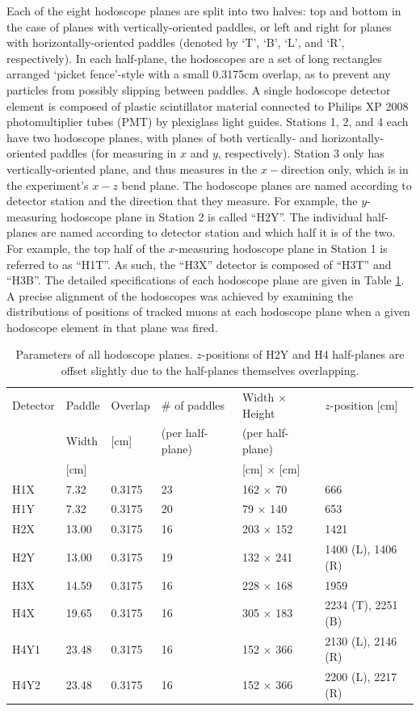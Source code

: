 Each of the eight hodoscope planes are split into two halves: top and bottom in the case of planes with vertically-oriented paddles, or left and right for planes with horizontally-oriented paddles (denoted by `T', `B', `L', and `R', respectively). In each half-plane, the hodoscopes are a set of long rectangles arranged `picket fence'-style with a small 0.3175cm overlap, as to prevent any particles from possibly slipping between paddles. A single hodoscope detector element is composed of plastic scintillator material connected to Philips XP 2008 photomultiplier tubes (PMT) by plexiglass light guides. Stations 1, 2, and 4 each have two hodoscope planes, with planes of both vertically- and horizontally-oriented paddles (for measuring in $x$ and $y$, respectively). Station 3 only has vertically-oriented plane, and thus measures in the $x-$direction only, which is in the experiment's $x-z$ bend plane. The hodoscope planes are named according to detector station and the direction that they measure. For example, the $y$-measuring hodoscope plane in Station 2 is called ``H2Y''. The individual half-planes are named according to detector station and which half it is of the two. For example, the top half of the $x$-measuring hodoscope plane in Station 1 is referred to as ``H1T''. As such, the ``H3X'' detector is composed of ``H3T'' and ``H3B''. The detailed specifications of each hodoscope plane are given in Table \ref{tab:hodoscopes}. A precise alignment of the hodoscopes was achieved by examining the distributions of positions of tracked muons at each hodoscope plane when a given hodoscope element in that plane was fired.

\begin{table}[bthp]\centering
  \begin{tabular}{llllll}
    \hline
    \hline
    Detector & Paddle & Overlap & \# of paddles & Width $\times$ Height & $z$-position [cm] \\
    & Width & [cm] & (per half-plane) & (per half-plane) &  \\
    & [cm] & & & [cm] $\times$ [cm] & \\
    \hline
    H1X & 7.32 & 0.3175 & 23 & 162 $\times$ 70 & 666 \\
    H1Y & 7.32 & 0.3175 & 20 & 79 $\times$ 140 & 653 \\
    H2X & 13.00 & 0.3175 & 16 & 203 $\times$ 152 & 1421 \\
    H2Y & 13.00 & 0.3175 & 19  & 132 $\times$ 241 & 1400 (L), 1406 (R) \\
    H3X & 14.59 & 0.3175 & 16  & 228 $\times$ 168 & 1959 \\
    H4X & 19.65 & 0.3175 & 16  &  305 $\times$ 183 & 2234 (T), 2251 (B) \\
    H4Y1 & 23.48 & 0.3175 & 16  & 152 $\times$ 366 & 2130 (L), 2146 (R) \\
    H4Y2 & 23.48 & 0.3175 & 16  & 152 $\times$ 366 & 2200 (L), 2217 (R)\\
    \hline
    \hline
  \end{tabular}
  \caption{Parameters of all hodoscope planes. $z$-positions of H2Y and H4 half-planes are offset slightly due to the half-planes themselves overlapping.}
  \label{tab:hodoscopes}
\end{table}

